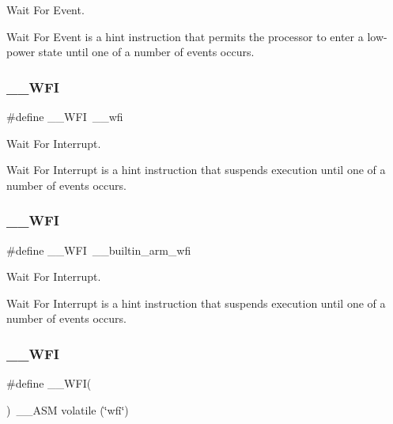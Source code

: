 Wait For Event. 

Wait For Event is a hint instruction that permits the processor to enter a low-\/power state until one of a number of events occurs. \mbox{\label{group___c_m_s_i_s___core___instruction_interface_gad23bf2b78a9a4524157c9de0d30b7448}} 
\subsubsection{\texorpdfstring{\_\_WFI}{\_\_WFI}\hspace{0.1cm}{\footnotesize\ttfamily [1/3]}}
{\footnotesize\ttfamily \#define \+\_\+\+\_\+\+W\+FI~\+\_\+\+\_\+wfi}



Wait For Interrupt. 

Wait For Interrupt is a hint instruction that suspends execution until one of a number of events occurs. \mbox{\label{group___c_m_s_i_s___core___instruction_interface_gad23bf2b78a9a4524157c9de0d30b7448}} 
\subsubsection{\texorpdfstring{\_\_WFI}{\_\_WFI}\hspace{0.1cm}{\footnotesize\ttfamily [2/3]}}
{\footnotesize\ttfamily \#define \+\_\+\+\_\+\+W\+FI~\+\_\+\+\_\+builtin\+\_\+arm\+\_\+wfi}



Wait For Interrupt. 

Wait For Interrupt is a hint instruction that suspends execution until one of a number of events occurs. \mbox{\label{group___c_m_s_i_s___core___instruction_interface_gab28e2b328c4cf23c917ab18a23194f8e}} 
\subsubsection{\texorpdfstring{\_\_WFI}{\_\_WFI}\hspace{0.1cm}{\footnotesize\ttfamily [3/3]}}
{\footnotesize\ttfamily \#define \+\_\+\+\_\+\+W\+FI(\begin{DoxyParamCaption}{ }\end{DoxyParamCaption})~\+\_\+\+\_\+\+A\+SM volatile (\char`\"{}wfi\char`\"{})}



